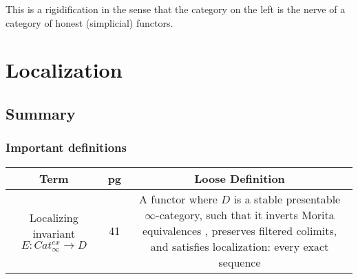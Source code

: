 \documentclass[letterpaper]{article}
\theoremstyle{definition}
\begin{document}
This is a rigidification in the sense that the category on the left is
the nerve of a category of honest (simplicial) functors.

\section{Localization}

\subsection{Summary}
\subsubsection{Important definitions}
\begin{tabulary}{0.9\textwidth}{|C|C|C|}
\hline
Term & pg & Loose Definition\\
\hline
\hline
Localizing invariant $E : Cat_\infty^{ex} \rightarrow D$ & 41 & A
                                                                functor
                                                                where
                                                                $D$ is
                                                                a
                                                                stable
                                                                presentable
                                                                $\infty$-category,
                                                                such
                                                                that
                                                                it
                                                                inverts
                                                                Morita
                                                                equivalences
                                                               ,
                                                                preserves
                                                                filtered
                                                                colimits,
                                                                and
                                                                satisfies
                                                                localization:
                                                                every
                                                                exact
                                                                sequence

\end{tabulary}
\end{document}
